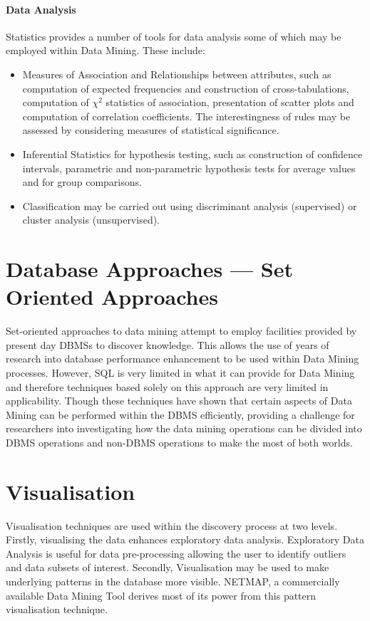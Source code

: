\documentclass[a4paper,12pt,notitlepage,pdftex]{scrreprt}
\begin{document}
        \paragraph{Data Analysis}
            Statistics provides a number of tools for data analysis some of which may be employed within Data Mining.
            These include:
            \begin{itemize}
                \item Measures of Association and Relationships between attributes, such as computation of expected
                    frequencies and construction of cross-tabulations, computation of $\chi^2$ statistics of
                    association, presentation of scatter plots and computation of correlation coefficients.
                    The interestingness of rules may be assessed by considering measures of statistical significance.
                \item Inferential Statistics for hypothesis testing, such as construction of confidence intervals,
                    parametric and non-parametric hypothesis tests for average values and for group comparisons.
                \item Classification may be carried out using discriminant analysis (supervised) or cluster analysis
                    (unsupervised).
            \end{itemize}

    \section{Database Approaches --- Set Oriented Approaches}
        Set-oriented approaches to data mining attempt to employ facilities provided by present day DBMSs to discover
        knowledge.
        This allows the use of years of research into database performance enhancement to be used within Data Mining
        processes.
        However, SQL is very limited in what it can provide for Data Mining and therefore techniques based solely on
        this approach are very limited in applicability.
        Though these techniques have shown that certain aspects of Data Mining can be performed within the DBMS
        efficiently, providing a challenge for researchers into investigating how the data mining operations can be
        divided into DBMS operations and non-DBMS operations to make the most of both worlds.

    \section{Visualisation}
        Visualisation techniques are used within the discovery process at two levels.
        Firstly, visualising the data enhances exploratory data analysis.
        Exploratory Data Analysis is useful for data pre-processing allowing the user to identify outliers and data
        subsets of interest.
        Secondly, Visualisation may be used to make underlying patterns in the database more visible.
        NETMAP, a commercially available Data Mining Tool derives most of its power from this pattern visualisation
        technique.
\end{document}
